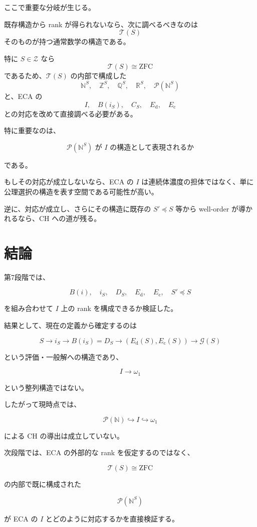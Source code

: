 \documentclass[a4paper,11pt]{article}
\begin{document}
ここで重要な分岐が生じる。

既存構造から rank が得られないなら、次に調べるべきなのは
\[
\mathcal T(S)
\]
そのものが持つ通常数学の構造である。

特に $S\in\mathcal{Z}$ なら
\[
\mathcal T(S)\cong\mathrm{ZFC}
\]
であるため、$\mathcal T(S)$ の内部で構成した
\[
\mathbb{N}^S,\quad
\mathbb Z^S,\quad
\mathbb Q^S,\quad
\mathbb R^S,\quad
\mathcal{P}(\mathbb{N}^S)
\]
と、ECA の
\[
I,\quad B(i_S),\quad C_S,\quad E_{\mathrm{d}},\quad E_{\mathrm{c}}
\]
との対応を改めて直接調べる必要がある。

特に重要なのは、

\[
\boxed{
\mathcal{P}(\mathbb{N}^S)
\text{ が }I\text{ の構造として表現されるか}
}
\]

である。

もしその対応が成立しないなら、ECA の $I$ は連続体濃度の担体ではなく、単に公理選択の構造を表す空間である可能性が高い。

逆に、対応が成立し、さらにその構造に既存の $S'\preceq S$ 等から well-order が導かれるなら、CH への道が残る。

\section{結論}

第7段階では、

\[
B(i),\quad i_S,\quad D_S,\quad
E_{\mathrm{d}},\quad E_{\mathrm{c}},\quad S'\preceq S
\]

を組み合わせて $I$ 上の rank を構成できるか検証した。

結果として、現在の定義から確定するのは

\[
S
\longrightarrow
i_S
\longrightarrow
B(i_S)=D_S
\longrightarrow
(E_{\mathrm{d}}(S),E_{\mathrm{c}}(S))
\longrightarrow
\mathcal G(S)
\]

という評価・一般解への構造であり、

\[
I\longrightarrow\omega_1
\]

という整列構造ではない。

したがって現時点では、

\[
\boxed{
\mathcal{P}(\mathbb{N})
\hookrightarrow I
\hookrightarrow\omega_1
}
\]

による CH の導出は成立していない。

次段階では、ECA の外部的な rank を仮定するのではなく、

\[
\mathcal T(S)\cong\mathrm{ZFC}
\]

の内部で既に構成された

\[
\mathcal{P}(\mathbb{N}^S)
\]

が ECA の $I$ とどのように対応するかを直接検証する。
\end{document}
